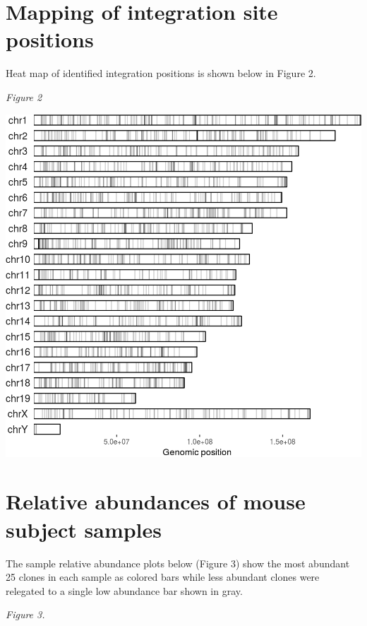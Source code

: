 \documentclass[12pt,]{article}
\begin{document}
\newpage

\section{Mapping of integration site
positions}\label{mapping-of-integration-site-positions}

Heat map of identified integration positions is shown below in Figure 2.

\emph{Figure 2}

\includegraphics{project.group2_files/figure-latex/fig2-1.png}

\newpage

\section{Relative abundances of mouse subject
samples}\label{relative-abundances-of-mouse-subject-samples}

The sample relative abundance plots below (Figure 3) show the most
abundant 25 clones in each sample as colored bars while less abundant
clones were relegated to a single low abundance bar shown in gray.

\emph{Figure 3.}
\end{document}
